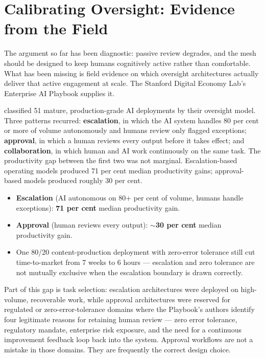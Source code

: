\section{Calibrating Oversight: Evidence from the Field}

The argument so far has been diagnostic: passive review degrades, and the mesh should be designed to keep humans cognitively active rather than comfortable. What has been missing is field evidence on which oversight architectures actually deliver that active engagement at scale. The Stanford Digital Economy Lab's Enterprise AI Playbook \parencite{Pereira2026Playbook} supplies it.

\textcite{Pereira2026Playbook} classified 51 mature, production-grade AI deployments by their oversight model. Three patterns recurred: \textbf{escalation}, in which the AI system handles 80 per cent or more of volume autonomously and humans review only flagged exceptions; \textbf{approval}, in which a human reviews every output before it takes effect; and \textbf{collaboration}, in which human and AI work continuously on the same task. The productivity gap between the first two was not marginal. Escalation-based operating models produced 71 per cent median productivity gains; approval-based models produced roughly 30 per cent.

\begin{evidencebox}[title={Escalation versus Approval: The Field Evidence}]
\begin{itemize}
  \item \textbf{Escalation} (AI autonomous on 80+ per cent of volume, humans handle exceptions): \textbf{71 per cent} median productivity gain.
  \item \textbf{Approval} (human reviews every output): \textbf{$\sim$30 per cent} median productivity gain.
  \item One 80/20 content-production deployment with zero-error tolerance still cut time-to-market from 7 weeks to 6 hours --- escalation and zero tolerance are not mutually exclusive when the escalation boundary is drawn correctly.
\end{itemize}
\end{evidencebox}

Part of this gap is task selection: escalation architectures were deployed on high-volume, recoverable work, while approval architectures were reserved for regulated or zero-error-tolerance domains where the Playbook's authors identify four legitimate reasons for retaining human review --- zero error tolerance, regulatory mandate, enterprise risk exposure, and the need for a continuous improvement feedback loop back into the system. Approval workflows are not a mistake in those domains. They are frequently the correct design choice.


